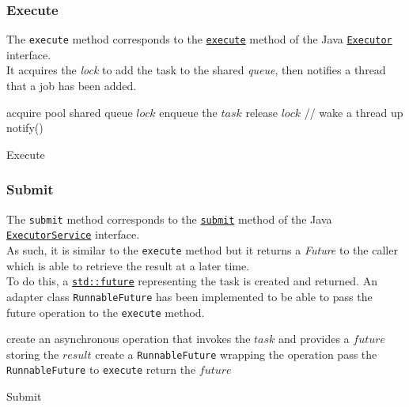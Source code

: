\documentclass[10pt,twocolumn,letterpaper]{article}
\begin{document}
	\subsubsection{Execute}
	The \lstinline|execute| method corresponds to the  \href{https://docs.oracle.com/javase/7/docs/api/java/util/concurrent/Executor.html#execute(java.lang.Runnable)}{\lstinline{execute}} method of the Java  \href{https://docs.oracle.com/javase/7/docs/api/java/util/concurrent/Executor.html}{\lstinline{Executor}} interface.\\
	It acquires the \textit{lock} to add the task to the shared \textit{queue}, then notifies a thread that a job has been added.
	\begin{algorithm}
		\SetAlgoLined
		acquire pool shared queue $lock$\;
		enqueue the $task$\;
		release $lock$\;
		// wake a thread up\\
		notify()\;
		\caption{Execute}
		\label{pseudo:execute}
	\end{algorithm}
	\subsubsection{Submit}
	The \lstinline|submit| method corresponds to the  \href{https://docs.oracle.com/javase/7/docs/api/java/util/concurrent/ExecutorService.html#submit(java.lang.Runnable,\%20T)}{\lstinline{submit}} method of the Java  \href{https://docs.oracle.com/javase/7/docs/api/java/util/concurrent/ExecutorService.html}{\lstinline{ExecutorService}} interface.\\
	As such, it is similar to the \lstinline|execute| method but it returns a \textit{Future} to the caller which is able to retrieve the result at a later time.\\
	To do this, a \href{https://en.cppreference.com/w/cpp/thread/future}{\lstinline|std::future|} representing the task is created and returned.
	An adapter class \lstinline|RunnableFuture| has been implemented to be able to pass the future operation to the \lstinline|execute| method.
	\begin{algorithm}
		\SetAlgoLined
		\KwData{$task$, $result$}
		create an asynchronous operation that invokes the $task$ and provides a $future$ storing the $result$\;
		create a \lstinline|RunnableFuture| wrapping the operation\;
		pass the \lstinline|RunnableFuture| to \lstinline|execute|\;
		return the $future$\;
		\caption{Submit}
		\label{pseudo:submit}
	\end{algorithm}
	
\end{document}
